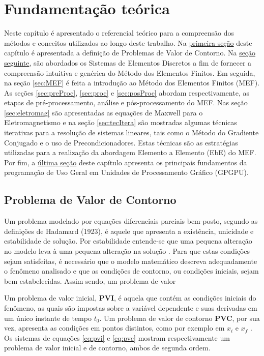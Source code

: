 \documentclass[
    12pt,               %
    openright,          %
    oneside,
    a4paper,            %
    english,            %
    french,             %
    spanish,            %
    brazil              %
    ]{abntex2}
\begin{document}
\chapter{Fundamentação teórica}
Neste capítulo é apresentado o referencial teórico para a compreensão dos métodos e conceitos utilizados ao longo deste trabalho. 
Na \hyperref[sec:PVC]{primeira seção} deste capítulo é apresentada a definição de Problemas de Valor de Contorno. 
Na \hyperref[sec:SED]{seção seguinte}, são abordados os Sistemas de Elementos Discretos a fim de fornecer a compreensão intuitiva e genérica do Método dos Elementos Finitos.
Em seguida, na seção \ref{sec:MEF} é feita a introdução ao Método dos Elementos Finitos (MEF). 
As seções \ref{sec:preProc}, \ref{sec:proc} e \ref{sec:posProc} abordam respectivamente, as etapas de pré-processamento, análise e pós-processamento do MEF.
Nas seção \ref{sec:eletromag} são apresentadas as equações de Maxwell para o Eletromagnetismo e na seção \ref{sec:tecItera} são mostradas algumas técnicas iterativas para a resolução de sistemas lineares, tais como o Método do Gradiente Conjugado e o uso de Precondicionadores. Estas técnicas são as estratégias utilizadas para a realização da abordagem Elemento a Elemento (EbE) do MEF.
Por fim, a \hyperref[sec:GPGPU]{última seção} deste capítulo apresenta os principais fundamentos da programação de Uso Geral em Unidades de Processamento Gráfico (GPGPU).

\section{Problema de Valor de Contorno}
\label{sec:PVC}

Um problema modelado por equações diferenciais parciais bem-posto, segundo as definições de Hadamard (1923), é aquele que   apresenta a existência, unicidade e estabilidade de solução. Por estabilidade entende-se que uma pequena alteração no modelo leva à uma pequena alteração na solução . Para que estas condições sejam satisfeitas, é necessário que o modelo matemático descreva adequadamente o fenômeno analisado e que as condições de contorno, ou condições iniciais, sejam bem estabelecidas. Assim sendo, um problema de valor 

Um problema de valor inicial, \textbf{PVI}, é aquela que contém as condições iniciais do fenômeno, as quais são impostas sobre a variável dependente e suas derivadas em um único instante de tempo $t_0$. Um problema de valor de contorno \textbf{PVC}, por sua vez, apresenta as condições em pontos distintos, como por exemplo em $x_i$ e $x_f$ \cite[p. 447]{boyceDiprima}. Os sistemas de equações \ref{eq:pvi} e \ref{eq:pvc} mostram respectivamente um problema de valor inicial e de contorno, ambos de segunda ordem.
\end{document}

